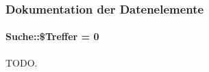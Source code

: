 \subsubsection{Dokumentation der Datenelemente}
\hypertarget{classSuche_0ee0e1ffb3f79392915fd39934d7140d}{
\paragraph[\$Treffer]{\setlength{\rightskip}{0pt plus 5cm}Suche::\$Treffer = 0}\hfill}
\label{classSuche_0ee0e1ffb3f79392915fd39934d7140d}


TODO. 

